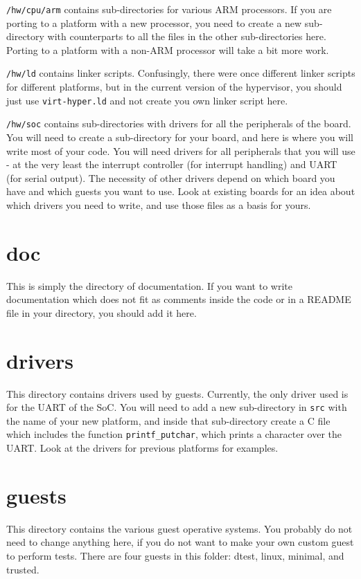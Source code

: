 \documentclass[a4paper,11pt,reqno]{amsart}
\begin{document}
\texttt{/hw/cpu/arm} contains sub-directories for various ARM processors. If you are porting to a platform with a new processor, you need to create a new sub-directory with counterparts to all the files in the other sub-directories here. Porting to a platform with a non-ARM processor will take a bit more work.

\texttt{/hw/ld} contains linker scripts. Confusingly, there were once different linker scripts for different platforms, but in the current version of the hypervisor, you should just use \texttt{virt-hyper.ld} and not create you own linker script here.

\texttt{/hw/soc} contains sub-directories with drivers for all the peripherals of the board. You will need to create a sub-directory for your board, and here is where you will write most of your code. You will need drivers for all peripherals that you will use - at the very least the interrupt controller (for interrupt handling) and UART (for serial output). The necessity of other drivers depend on which board you have and which guests you want to use. Look at existing boards for an idea about which drivers you need to write, and use those files as a basis for yours.

\section{doc}
\noindent
This is simply the directory of documentation. If you want to write documentation which does not fit as comments inside the code or in a README file in your directory, you should add it here.

\section{drivers}
\noindent
This directory contains drivers used by guests. Currently, the only driver used is for the UART of the SoC. You will need to add a new sub-directory in \texttt{src} with the name of your new platform, and inside that sub-directory create a C file which includes the function \texttt{printf\_putchar}, which prints a character over the UART. Look at the drivers for previous platforms for examples.

\section{guests}
\noindent
This directory contains the various guest operative systems. You probably do not need to change anything here, if you do not want to make your own custom guest to perform tests. There are four guests in this folder: dtest, linux, minimal, and trusted.
\end{document}
